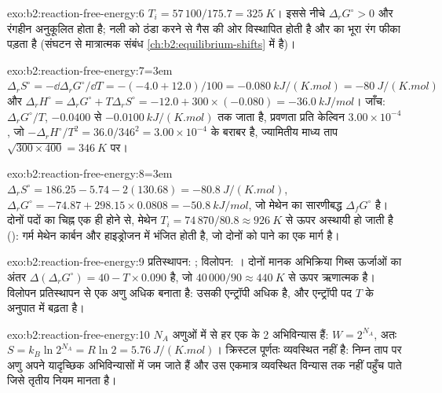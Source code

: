 \begin{solution}{exo:b2:reaction-free-energy:6}
$T_i = 57\,100/175.7 = \qty{325}{K}$। इससे नीचे $\Delta_r G^\circ > 0$ और
रंगहीन  अनुकूलित होता है; नली को ठंडा करने से गैस
 की ओर विस्थापित होती है और  का भूरा रंग फीका पड़ता है (संघटन से
मात्रात्मक संबंध \cref{ch:b2:equilibrium-shifts} में है)।
\end{solution}

\begin{solution}{exo:b2:reaction-free-energy:7}\emergencystretch=3em
$\Delta_r S^\circ = -\dd\Delta_r G^\circ/\dd T = -(-4.0 + 12.0)/100 =
\qty{-0.080}{kJ/(K.mol)} = \qty{-80}{J/(K.mol)}$ और $\Delta_r H^\circ =
\Delta_r G^\circ + T\Delta_r S^\circ = -12.0 + 300 \times (-0.080) =
\qty{-36.0}{kJ/mol}$। जाँच: $\Delta_r G^\circ/T$, $-0.0400$ से
$\qty{-0.0100}{kJ/(K.mol)}$ तक जाता है, प्रवणता प्रति केल्विन $3.00 \times 10^{-4}$, जो
$-\Delta_r H^\circ/T^2 = 36.0/346^2 = 3.00 \times 10^{-4}$ के बराबर है, ज्यामितीय
माध्य ताप $\sqrt{300 \times 400} = \qty{346}{K}$ पर।
\end{solution}

\begin{solution}{exo:b2:reaction-free-energy:8}\emergencystretch=3em
$\Delta_r S^\circ = 186.25 - 5.74 - 2(130.68) = \qty{-80.8}{J/(K.mol)}$,
$\Delta_r G^\circ = -74.87 + 298.15 \times 0.0808 = \qty{-50.8}{kJ/mol}$,
जो मेथेन का सारणीबद्ध $\Delta_f G^\circ$ है। दोनों पदों का चिह्न
एक ही होने से, मेथेन $T_i = 74\,870/80.8 \approx
\qty{926}{K}$ से ऊपर अस्थायी हो जाती है (): गर्म मेथेन कार्बन और
हाइड्रोजन में भंजित होती है, जो दोनों को पाने का एक मार्ग है।
\end{solution}

\begin{solution}{exo:b2:reaction-free-energy:9}
प्रतिस्थापन: ; विलोपन:
। दोनों मानक अभिक्रिया
गिब्स ऊर्जाओं का अंतर $\Delta(\Delta_r G^\circ) = 40 - T \times
0.090$ है, जो $40\,000/90 \approx \qty{440}{K}$ से ऊपर ऋणात्मक है। विलोपन
प्रतिस्थापन से एक अणु अधिक बनाता है: उसकी एन्ट्रॉपी अधिक है, और एन्ट्रॉपी
पद $T$ के अनुपात में बढ़ता है।
\end{solution}

\begin{solution}{exo:b2:reaction-free-energy:10}
$N_A$ अणुओं में से हर एक के 2 अभिविन्यास हैं: $W = 2^{N_A}$, अतः $S =
k_B\ln 2^{N_A} = R\ln 2 = \qty{5.76}{J/(K.mol)}$। क्रिस्टल
पूर्णतः व्यवस्थित नहीं है: निम्न ताप पर अणु अपने यादृच्छिक अभिविन्यासों में
जम जाते हैं और उस एकमात्र व्यवस्थित विन्यास तक नहीं पहुँच पाते जिसे तृतीय
नियम मानता है।
\end{solution}

